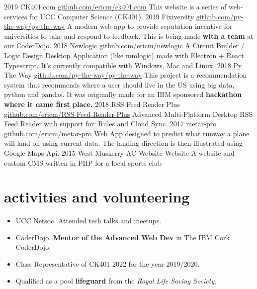 \documentclass[]{friggeri-cv}
\begin{document}
\begin{entrylist}
  \entry
    {2019}
    {CK401.com}
    {\href{https://github.com/ericm/ck401.com}{github.com/ericm/ck401.com}}
    {This website is a series of web-services for UCC Computer Science (CK401).}
  \entry
    {2019}
    {Fixiversity}
    {\href{https://github.com/py-the-way/py-the-way}{github.com/py-the-way/py-the-way}}
    {A modern web-app to provide reputation incentive for universities to take and respond to feedback. This is being made \textbf{with a team} at our CoderDojo.}
  \entry
    {2018}
    {Newlogic}
    {\href{https://github.com/ericm/newlogic}{github.com/ericm/newlogic}}
    {A Circuit Builder / Logic Design Desktop Application (like mmlogic) made with Electron + React Typescript. It's currently compatible with Windows, Mac and Linux.}
  \entry
    {2018}
    {Py The Way}
    {\href{https://github.com/py-the-way/py-the-way}{github.com/py-the-way/py-the-way}}
    {This project is a recommendation system that recommends where a user should live in the US using big data, python and pandas. It was originally made for an IBM sponsored \textbf{hackathon where it came first place.}}
  \entry
    {2018}
    {RSS Feed Reader Plus}
    {\href{https://github.com/ericm/RSS-Feed-Reader-Plus}{github.com/ericm/RSS-Feed-Reader-Plus}}
    {Advanced Multi-Platform Desktop RSS Feed Reader with support for: Rules and Cloud Sync.}
  \entry
    {2017}
    {metar-pro}
    {\href{https://github.com/ericm/metar-pro}{github.com/ericm/metar-pro}}
    {Web App designed to predict what runway a plane will land on using current data. The landing direction is then illustrated using Google Maps Api.}
  \entry
    {2015}
    {West Muskerry AC Website}
    {Website}
    {A website and custom CMS written in PHP for a local sports club}

\end{entrylist}

\section{activities and volunteering}
\begin{itemize}
    \item UCC Netsoc. Attended tech talks and meetups.
    \item CoderDojo. \textbf{Mentor of the Advanced Web Dev} in The IBM Cork CoderDojo.
    \item Class Representative of CK401 2022 for the year 2019/2020.
    \item Qualified as a pool \textbf{lifeguard} from the \textit{Royal Life Saving Society}.
\end{itemize}
\end{document}
